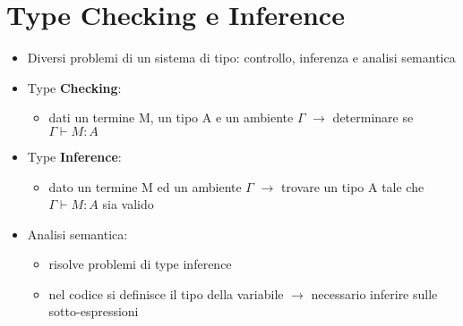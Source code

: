\documentclass[12pt]{extarticle}
\begin{document}
\section*{Type Checking e Inference}
\begin{itemize}
  \item Diversi problemi di un sistema di tipo: controllo, inferenza e analisi semantica
  \item Type \textbf{Checking}:
  \begin{itemize}
    \item dati un termine M, un tipo A e un ambiente $\Gamma$ $\rightarrow$ determinare se $\Gamma \vdash M:A$
  \end{itemize}
  \item Type \textbf{Inference}:
  \begin{itemize}
    \item dato un termine M ed un ambiente $\Gamma$ $\rightarrow$ trovare un tipo A tale che $\Gamma \vdash M:A$ sia valido
  \end{itemize}
  \item Analisi semantica:
  \begin{itemize}
    \item risolve problemi di type inference
    \item nel codice si definisce il tipo della variabile $\rightarrow$ necessario inferire sulle sotto-espressioni
  \end{itemize}
\end{itemize}

\newpage
\end{document}
